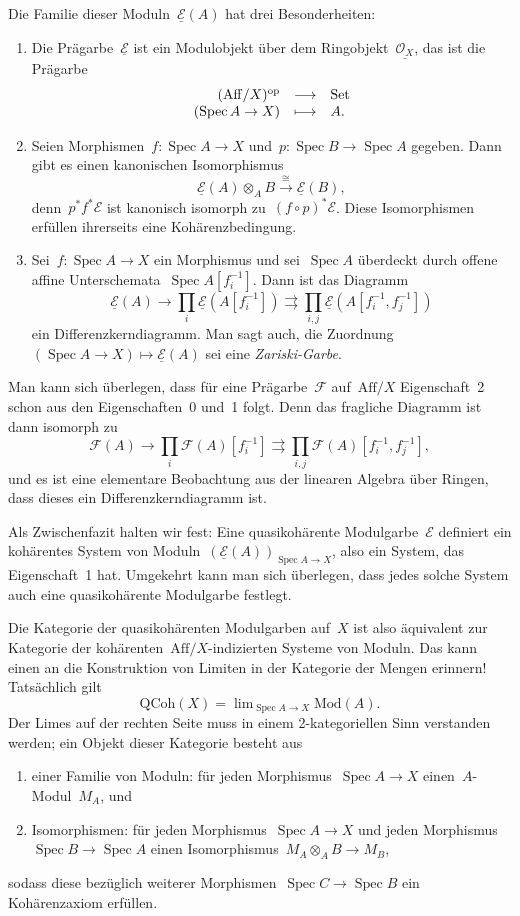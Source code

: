 \documentclass[a4paper,ngerman,12pt]{scrartcl}
\theoremstyle{definition}
\theoremstyle{plain}
\theoremstyle{remark}
\newcommand{\E}{\mathcal{E}}
\newcommand{\F}{\mathcal{F}}
\renewcommand{\O}{\mathcal{O}}
\newcommand{\op}{\mathrm{op}}
\newcommand{\Set}{\mathrm{Set}}
\newcommand{\ul}[1]{\underline{#1}}
\newcommand{\lra}{\longrightarrow}
\DeclareMathOperator{\Spec}{Spec}
\begin{document}
Die Familie dieser Moduln~$\ul{\E}(A)$ hat drei Besonderheiten:
\begin{enumerate}
\addtocounter{enumi}{-1}
\item Die Prägarbe~$\ul{\E}$ ist ein Modulobjekt über dem
Ringobjekt~$\ul{\O_X}$, das ist die Prägarbe
\[ \begin{array}{@{}rcl@{}}
  (\mathrm{Aff}/X)^\op &\lra& \Set \\
  (\Spec A \to X) &\longmapsto& A.
\end{array} \]
\item Seien Morphismen~$f : \Spec A \to X$ und~$p : \Spec B \to \Spec A$ gegeben. Dann
gibt es einen kanonischen Isomorphismus
\[ \ul{\E}(A) \otimes_A B \stackrel{\cong}{\lra} \ul{\E}(B), \]
denn~$p^* f^* \E$ ist kanonisch isomorph zu~$(f \circ p)^*\E$.
Diese Isomorphismen erfüllen ihrerseits eine Kohärenzbedingung.

\item Sei~$f : \Spec A \to X$ ein Morphismus und sei~$\Spec A$ überdeckt durch
offene affine Unterschemata~$\Spec A[f_i^{-1}]$. Dann ist das Diagramm
\[ \ul{\E}(A) \to \prod_i \ul{\E}(A[f_i^{-1}]) \rightrightarrows \prod_{i,j}
\ul{\E}(A[f_i^{-1},f_j^{-1}]) \]
ein Differenzkerndiagramm. Man sagt auch, die Zuordnung~$(\Spec A \to X)
\mapsto \ul{\E}(A)$ sei eine \emph{Zariski-Garbe}.
\end{enumerate}

Man kann sich überlegen, dass für eine Prägarbe~$\F$ auf~$\mathrm{Aff}/X$
Eigenschaft~2 schon aus den Eigenschaften~0 und~1 folgt. Denn das fragliche Diagramm ist
dann isomorph zu
\[ \F(A) \to \prod_i \F(A)[f_i^{-1}] \rightrightarrows \prod_{i,j}
\F(A)[f_i^{-1},f_j^{-1}], \]
und es ist eine elementare Beobachtung aus der linearen Algebra über Ringen,
dass dieses ein Differenzkerndiagramm ist.

Als Zwischenfazit halten wir fest: Eine quasikohärente Modulgarbe~$\E$
definiert ein kohärentes System von Moduln~$(\ul{\E}(A))_{\Spec A \to X}$, also ein
System, das Eigenschaft~1 hat. Umgekehrt kann man sich überlegen, dass jedes
solche System auch eine quasikohärente Modulgarbe festlegt.

Die Kategorie der quasikohärenten Modulgarben auf~$X$ ist also äquivalent zur
Kategorie der kohärenten~$\mathrm{Aff}/X$-indizierten Systeme von Moduln. Das kann
einen an die Konstruktion von Limiten in der Kategorie der Mengen erinnern!
Tatsächlich gilt
\[ \mathrm{QCoh}(X) = \lim\nolimits_{\Spec A \to X} \mathrm{Mod}(A). \]
Der Limes auf der rechten Seite muss in einem 2-kategoriellen Sinn verstanden
werden; ein Objekt dieser Kategorie besteht aus
\begin{enumerate}
\item einer Familie von Moduln: für jeden Morphismus~$\Spec A \to X$
einen~$A$-Modul~$M_A$, und
\item Isomorphismen: für jeden Morphismus~$\Spec A \to X$ und jeden
Morphismus~$\Spec B \to \Spec A$ einen Isomorphismus~$M_A \otimes_A B \to
M_B$,
\end{enumerate}
sodass diese bezüglich weiterer Morphismen~$\Spec C \to \Spec B$ ein
Kohärenzaxiom erfüllen.
\end{document}
